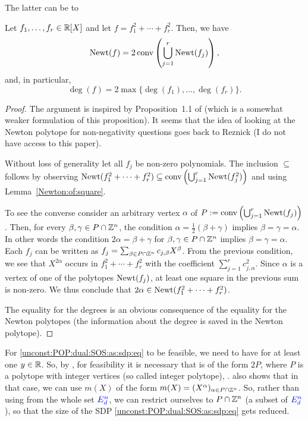The latter can be  to

\begin{proposition} \label{newton:SOS}
	Let $f_1,\ldots,f_r \in \mathbb{R}[X]$ and let $f=f_1^2 + \cdots + f_r^2$. Then, we have
	\[
		\operatorname{Newt}(f) = 2 \operatorname{conv} \left( \bigcup_{j=1}^r \operatorname{Newt}(f_j) \right),
	\]
	and, in particular, 
	\[
		\deg(f) = 2 \max \{\deg(f_1),\ldots,\deg(f_r)\}. 
	\]
\end{proposition} 
\begin{proof}
	The argument is inspired by Proposition~1.1 of \cite{chua2016gram} (which is a somewhat weaker formulation of this proposition). It seems that the idea of looking at the Newton polytope for non-negativity questions goes back to Reznick \cite{Reznick1978} (I do not have access to this paper). 
	
	Without loss of generality let all $f_j$ be non-zero polynomials. The inclusion $\subseteq$ follows by observing $\operatorname{Newt}(f_1^2 + \cdots + f_r^2) \subseteq \operatorname{conv} \left(\bigcup_{j=1}^r \operatorname{Newt}(f_j^2) \right)$ and using Lemma~\ref{Newton:of:square}.
	
	To see the converse consider an arbitrary vertex $\alpha$ of $P:=\operatorname{conv} \left( \bigcup_{j=1}^r \operatorname{Newt}(f_j) \right)$. Then, for every $\beta,\gamma \in P \cap \mathbb{Z}^n$, the condition $\alpha = \frac{1}{2}(\beta + \gamma)$ implies $\beta = \gamma = \alpha$.  In other words the condition $2 \alpha = \beta+ \gamma$ for $\beta, \gamma \in P \cap \mathbb{Z}^n$ implies $\beta=\gamma =\alpha$. Each $f_j$ can be written as $f_j = \sum_{\beta \in P \cap \mathbb{Z}^n} c_{j,\beta} X^\beta$. From the previous condition, we see that $X^{2 \alpha}$ occurs in $f_1^2 + \cdots + f_r^2$ with the coefficient $\sum_{j=1}^r c_{j,\alpha}^2$. Since $\alpha$ is a vertex of one of the polytopes $\operatorname{Newt}(f_j)$, at least one square in the previous sum is non-zero. We thus conclude that $2 \alpha \in \operatorname{Newt}(f_1^2 + \cdots +f_r^2)$. 
	
	The equality for the degrees is an obvious consequence of the equality for the Newton polytopes (the information about the degree is saved in the Newton polytope). 
\end{proof}

For \eqref{unconst:POP:dual:SOS:as:sdp:eq} to be feasible, we need to have  for at least one $y \in \mathbb{R}$.
 So, by ,  for feasibility it is necessary that  is of the form $2 P$, where $P$ is a polytope with integer vertices (so called integer polytope), .  also shows that in that case, we can use $m(X)$ of the form $m(X) = (X^\alpha)_{\alpha \in P \cap \mathbb{Z}^n}$. So, rather than using  from the whole set $\textcolor{blue}{E^n_d}$, we can restrict ourselves to $P \cap \mathbb{Z}^n$ (a subset of $\textcolor{blue}{E^n_d}$), so that the size of the SDP \eqref{unconst:POP:dual:SOS:as:sdp:eq} gets reduced. 

